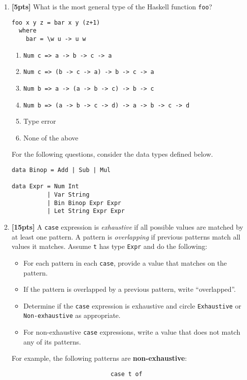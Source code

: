 \documentclass[paper=letter, fontsize=13pt]{article} %
\numberwithin{equation}{section} %
\newif\ifshowanswers\showanswersfalse
\begin{document}
\begin{enumerate}
\item \textbf{[5pts]} What is the most general type of the Haskell function \texttt{foo}?
\begin{lstlisting}
foo x y z = bar x y (z+1)
  where
    bar = \w u -> u w
\end{lstlisting}
    \begin{enumerate} 
         \item \verb|Num c => a -> b -> c -> a|
         \item \verb|Num c => (b -> c -> a) -> b -> c -> a|
         \item \verb|Num b => a -> (a -> b -> c) -> b -> c|
         \item \verb|Num b => (a -> b -> c -> d) -> a -> b -> c -> d|
         \item Type error
         \item None of the above
     \end{enumerate}
\ifshowanswers
Answer: C
\fi

\newpage
For the following questions, consider the data types defined below.
\begin{lstlisting}
data Binop = Add | Sub | Mul

data Expr = Num Int              
          | Var String
          | Bin Binop Expr Expr  
          | Let String Expr Expr     

\end{lstlisting}

\item \textbf{[15pts]} A \texttt{case} expression is \textit{exhaustive} if all possible values are matched
by at least one pattern. A pattern is \textit{overlapping} if previous patterns match all values it matches.
Assume \texttt{t} has type \texttt{Expr} and do the following:
\begin{itemize}
  \item For each pattern in each \texttt{case}, provide a value that matches on the pattern.
  \item If the pattern is overlapped by a previous pattern, write ``overlapped''.
  \item Determine if the \texttt{case} expression is exhaustive and circle \texttt{Exhaustive} or \texttt{Non-exhaustive} as appropriate.
  \item For non-exhaustive \texttt{case} expressions, write a value that does not match any of its patterns.
\end{itemize}
For example, the following patterns are \textbf{non-exhaustive}: 
\begin{lstlisting}
                            case t of


\end{lstlisting}
\end{enumerate}
\end{document}
